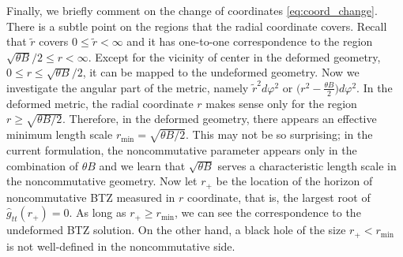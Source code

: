 \documentclass[11pt]{article}
\newcommand{\vap}{\varphi}
\numberwithin{equation}{section}
\begin{document}
Finally, we briefly comment on the change of coordinates
\eqref{eq:coord_change}. 
There is a subtle point on the regions that the radial
coordinate covers.
Recall that $\tilde{r}$ covers $0\leq \tilde{r} < \infty$ and it has one-to-one correspondence to
the region $\sqrt{\theta B}/2 \leq r <\infty$.
Except for the vicinity of center in the deformed geometry, $0\leq r \leq \sqrt{\theta B}/2$, 
it can be mapped to the undeformed geometry.
Now we investigate the angular part of the metric, namely $\tilde{r}^2 d\vap^2$ or $\big( r^2 - \frac{\theta B}{2}\big) d\vap^2$.
In the deformed metric, the radial coordinate $r$ makes sense only for the region $r \geq \sqrt{\theta B/2}$.
Therefore, in the deformed geometry, there appears an effective minimum length scale
$r_\text{min}=\sqrt{\theta B/2}$.
This may not be so surprising; in the current formulation, the
noncommutative parameter appears only in the combination of $\theta B$
and we learn that $\sqrt{\theta B}$ serves a characteristic length scale in the
noncommutative geometry.
Now let $r_+$ be the location of the horizon of noncommutative BTZ measured in $r$ coordinate, that is, the largest root of $\hat{g}_{tt}(r_+)=0$.
As long as $r_+\geq r_\text{min}$, we can see the correspondence to
the undeformed BTZ solution.
On the other hand, a black hole of the size $r_+ < r_\text{min}$ is not
well-defined in the noncommutative side.
\end{document}
